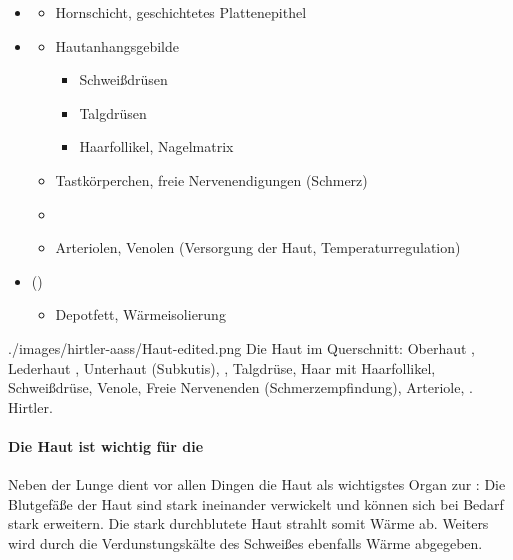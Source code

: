 {%

\begin{itemize}
    \item {}   
    \begin{itemize}
        \item Hornschicht, geschichtetes Plattenepithel
    \end{itemize}
    \item {} 
    \begin{itemize}
        \item Hautanhangsgebilde
        \begin{itemize}
            \item Schweißdrüsen
            \item Talgdrüsen
            \item Haarfollikel, Nagelmatrix
        \end{itemize}
        \item Tastkörperchen, freie Nervenendigungen (Schmerz)
        \item {}
        \item Arteriolen, Venolen (Versorgung der Haut, Temperaturregulation)
    \end{itemize}
    \item {} ()  
    \begin{itemize}
        \item Depotfett, Wärmeisolierung
    \end{itemize}
\end{itemize}
}{}
{./images/hirtler-aass/Haut-edited.png}
{Die Haut im Querschnitt:  Oberhaut ,
 Lederhaut ,
 Unterhaut (Subkutis),
 ,
 Talgdrüse,
 Haar mit Haarfollikel,
 Schweißdrüse,
 Venole,
 Freie Nervenenden (Schmerzempfindung),
 Arteriole,
 .
}
{Hirtler.}




\paragraph{Die Haut ist wichtig für die
}
Neben der Lunge dient vor allen Dingen  die Haut als wichtigstes Organ
zur : Die Blutgefäße  der  Haut
sind stark ineinander verwickelt und können sich bei Bedarf stark erweitern. Die
stark durchblutete  Haut strahlt somit Wärme ab. Weiters wird durch
die Verdunstungskälte  des Schweißes  ebenfalls Wärme
abgegeben. 

